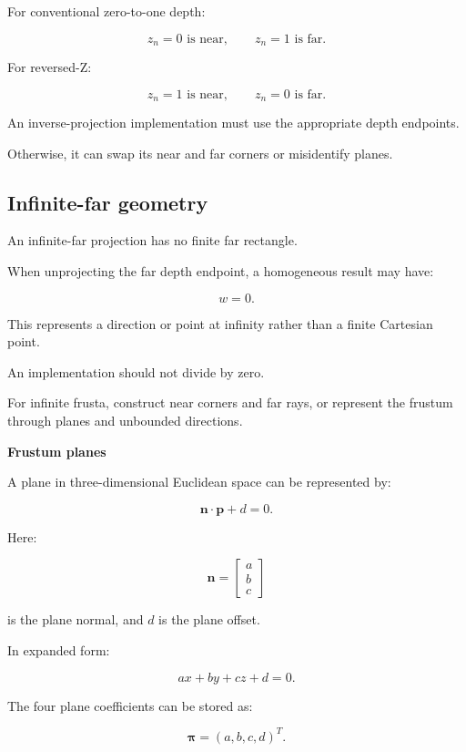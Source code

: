 \hypertarget{02-foundations-ii-ch034-reversed-z-changes-corner-assignments}{}

For conventional zero-to-one depth:

\[
 z_n=0 \text{ is near},\qquad z_n=1 \text{ is far}.
\]

For reversed-Z:

\[
 z_n=1 \text{ is near},\qquad z_n=0 \text{ is far}.
\]

An inverse-projection implementation must use the appropriate depth endpoints.

Otherwise, it can swap its near and far corners or misidentify planes.

\subsection{Infinite-far geometry}\label{02-foundations-ii-ch034-infinite-far-geometry}

\hypertarget{02-foundations-ii-ch034-infinite-far-geometry}{}

An infinite-far projection has no finite far rectangle.

When unprojecting the far depth endpoint, a homogeneous result may have:

\[
 w=0.
\]

This represents a direction or point at infinity rather than a finite Cartesian point.

An implementation should not divide by zero.

For infinite frusta, construct near corners and far rays, or represent the frustum through planes and unbounded directions.

\textbf{Frustum planes}

A plane in three-dimensional Euclidean space can be represented by:

\[
 \boxed{ \mathbf n\cdot\mathbf p+d=0 }.
\]

Here:

\[
 \mathbf n= \begin{bmatrix}a\\b\\c\end{bmatrix}
\]

is the plane normal, and \(d\) is the plane offset.

In expanded form:

\[
 \boxed{ ax+by+cz+d=0 }.
\]

The four plane coefficients can be stored as:

\[
 \boxed{ \boldsymbol\pi=(a,b,c,d)^T }.
\]

